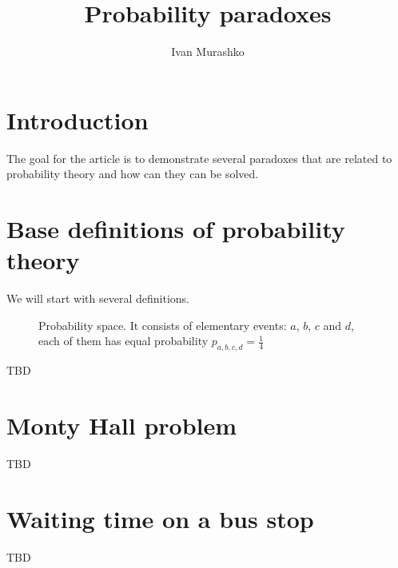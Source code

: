 \documentclass[14pt,a4paper]{article}
\title{Probability paradoxes}
\author{Ivan Murashko}
\date{}
\begin{document}
\maketitle
\tableofcontents

\section*{Introduction}
The goal for the article is to demonstrate several paradoxes that are
related to probability theory and how can they can be solved.

\section{Base definitions of probability theory}
We will start with several definitions.

\begin{figure}
  \centering
  \caption{Probability space. It consists of elementary events: $a$,
    $b$, $c$ and $d$, each
    of them has equal probability $p_{a,b,c,d} = \frac{1}{4}$}
  \label{fig:probabilityspace}
\end{figure}


TBD \cite{bib:kolmogorov74basic}

\section{Monty Hall problem}
TBD

\section{Waiting time on a bus stop}
TBD

  
     
\end{document}

